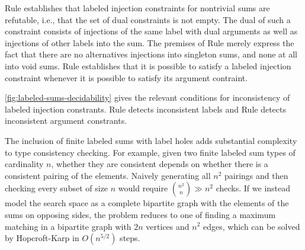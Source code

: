 
Rule \RXInj establishes that labeled injection constraints for nontrivial sums are refutable, i.e., that the set of dual constraints is not empty.
The dual of such a constraint consists of injections of the same label with dual arguments as well as injections of other labels into the sum.
The premises of Rule \RXInj merely express the fact that there are no alternatives injections into singleton sums, and none at all into void sums.
Rule \PInj establishes that it is possible to satisfy a labeled injection constraint whenever it is possible to satisfy its argument contraint.


\autoref{fig:labeled-sums-decidability} gives the relevant conditions for inconsistency of labeled injection constrants.
Rule \CINCInjTag detects inconsistent labels and
Rule \CINCInjArg detects inconsistent argument constrants.

The inclusion of finite labeled sums with label holes adds substantial complexity to type consistency checking.
For example, given two finite labeled sum types of cardinality $n$,
whether they are consistent depends on whether there is a consistent pairing of the elements.
Naively generating all $n^2$ pairings and then checking every subset of size $n$ 
would require $\binom{n^2}{n} \gg n^2$ checks.
If we instead model the search space as a complete bipartite graph with the elements of the sums on opposing sides,
the problem reduces to one of finding a maximum matching in a bipartite graph with $2n$ vertices and $n^2$ edges,
which can be solved by Hopcroft-Karp \cite{HopcroftKarp} in $O(n^{5/2})$ steps.
